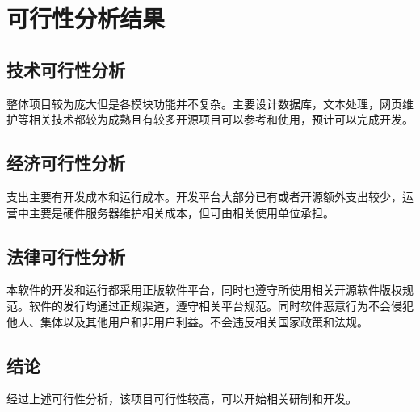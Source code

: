 \chapter{可行性分析结果}
\section{技术可行性分析}
整体项目较为庞大但是各模块功能并不复杂。主要设计数据库，文本处理，网页维护等相关技术都较为成熟且有较多开源项目可以参考和使用，预计可以完成开发。
\section{经济可行性分析}
支出主要有开发成本和运行成本。开发平台大部分已有或者开源额外支出较少，运营中主要是硬件服务器维护相关成本，但可由相关使用单位承担。
\section{法律可行性分析}
本软件的开发和运行都采用正版软件平台，同时也遵守所使用相关开源软件版权规范。软件的发行均通过正规渠道，遵守相关平台规范。同时软件恶意行为不会侵犯他人、集体以及其他用户和非用户利益。不会违反相关国家政策和法规。
\section{结论}
经过上述可行性分析，该项目可行性较高，可以开始相关研制和开发。
